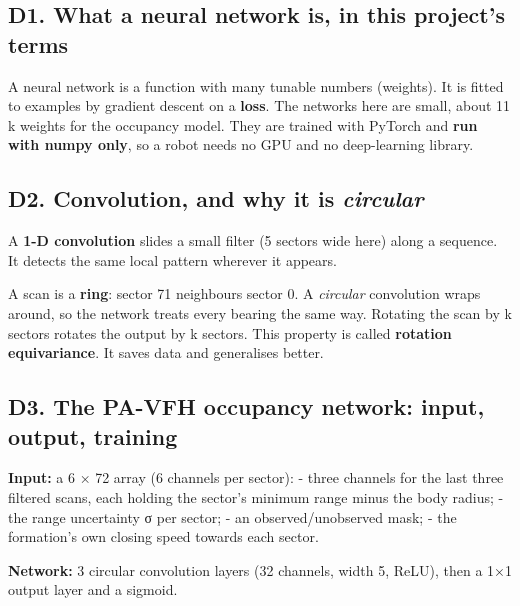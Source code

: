 \documentclass[
  10.5pt,
  a4paper,
]{article}
\begin{document}
\hypertarget{d1.-what-a-neural-network-is-in-this-projects-terms}{%
\subsection{D1. What a neural network is, in this project's
terms}\label{d1.-what-a-neural-network-is-in-this-projects-terms}}

A neural network is a function with many tunable numbers (weights). It
is fitted to examples by gradient descent on a \textbf{loss}. The
networks here are small, about 11 k weights for the occupancy model.
They are trained with PyTorch and \textbf{run with numpy only}, so a
robot needs no GPU and no deep-learning library.

\hypertarget{d2.-convolution-and-why-it-is-circular}{%
\subsection{\texorpdfstring{D2. Convolution, and why it is
\emph{circular}}{D2. Convolution, and why it is circular}}\label{d2.-convolution-and-why-it-is-circular}}

A \textbf{1-D convolution} slides a small filter (5 sectors wide here)
along a sequence. It detects the same local pattern wherever it appears.

A scan is a \textbf{ring}: sector 71 neighbours sector 0. A
\emph{circular} convolution wraps around, so the network treats every
bearing the same way. Rotating the scan by k sectors rotates the output
by k sectors. This property is called \textbf{rotation equivariance}. It
saves data and generalises better.

\hypertarget{d3.-the-pa-vfh-occupancy-network-input-output-training}{%
\subsection{D3. The PA-VFH occupancy network: input, output,
training}\label{d3.-the-pa-vfh-occupancy-network-input-output-training}}

\textbf{Input:} a 6 × 72 array (6 channels per sector): - three channels
for the last three filtered scans, each holding the sector's minimum
range minus the body radius; - the range uncertainty σ per sector; - an
observed/unobserved mask; - the formation's own closing speed towards
each sector.

\textbf{Network:} 3 circular convolution layers (32 channels, width 5,
ReLU), then a 1×1 output layer and a sigmoid.
\end{document}
